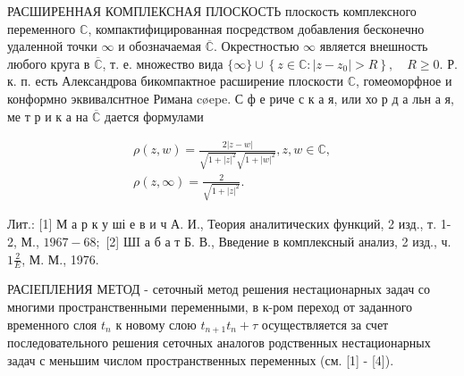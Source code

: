 \documentclass[10pt]{article}
\begin{document}
РАСШИРЕННАЯ КОМПЛЕКСНАЯ ПЛОСКОСТЬ плоскость комплексного переменного $\mathbb{C}$, компактифицированная посредством добавления бесконечно удаленной точки $\infty$ и обозначаемая $\overline{\mathbb{C}}$. Окрестностью $\infty$ является внешность любого круга в $\overline{\mathbb{C}}$, т. е. множество вида $\{\infty\} \cup\left\{z \in \mathbb{C}:\left|z-z_{0}\right|>R\right\}, \quad R \geqslant 0$. Р. к. п. есть Александрова бикомпактное расширение плоскости $\mathbb{C}$, гомеоморфное и конформно эквивалснтное Римана cøepe. С ф е риче с к а я, или хо р д а льн а я, ме т р и к а на $\overline{\mathbb{C}}$ дается формулами



\[

\begin{gathered}

\rho(z, w)=\frac{2|z-w|}{\sqrt{1+|z|^{2}} \sqrt{1+|w|^{2}}}, z, w \in \mathbb{C}, \\

\rho(z, \infty)=\frac{2}{\sqrt{1+|z|^{2}}} .

\end{gathered}

\]



Лит.: [1] М а р к у ші е в и ч А. И., Теория аналитических функций, 2 изд., т. 1-2, М., $1967-68 ;$ [2] ШI а б а т Б. В., Введение в комплексный анализ, 2 изд., ч. $1 \frac{2}{E}$, М. М., 1976.



РАСІЕПЛЕНИЯ МЕТОД - сеточный метод решения нестационарных задач со многими пространственными переменными, в к-ром переход от заданного временного слоя $t_{n}$ к новому слою $t_{n+1} t_{n}+\tau$ осуществляется за счет последовательного решения сеточных аналогов родственных нестационарных задач с меньшим числом пространственных переменных (см. [1] - [4]).
\end{document}

